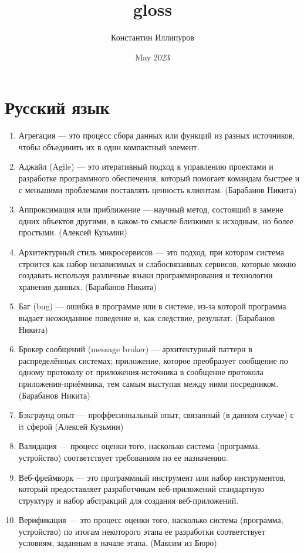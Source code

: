 \documentclass{article}
\title{gloss}
\author{Константин Иллипуров}
\date{May 2023}
\begin{document}

\section{Русский язык}
\begin{enumerate}
    \item Агрегация --- это процесс сбора данных или функций из разных источников, чтобы объединить их в один компактный элемент.
    \item Аджайл (Agile) --- это итеративный подход к управлению проектами и разработке программного обеспечения, который помогает командам быстрее и с меньшими проблемами поставлять ценность клиентам. (Барабанов Никита)
    \item Аппроксимация или приближение --- научный метод, состоящий в замене одних объектов другими, в каком-то смысле близкими к исходным, но более простыми. (Алексей Кузьмин) 
    \item Архитектурный стиль микросервисов --- это подход, при котором система строится как набор независимых и слабосвязанных сервисов, которые можно создавать используя различные языки программирования и технологии хранения данных. (Барабанов Никита)
    \item Баг (bug) --- ошибка в программе или в системе, из-за которой программа выдает неожиданное поведение и, как следствие, результат. (Барабанов Никита)
    \item Брокер сообщений (message broker) --- архитектурный паттерн в распределённых системах; приложение, которое преобразует сообщение по одному протоколу от приложения-источника в сообщение протокола приложения-приёмника, тем самым выступая между ними посредником. (Барабанов Никита)
    \item Бэкграунд опыт --- проффесиональный опыт, связанный (в данном случае) с it сферой (Алексей Кузьмин)
    \item Валидация --- процесс оценки того, насколько система (программа, устройство) соответствует требованиям по ее назначению.
    \item Веб-фреймворк --- это программный инструмент или набор инструментов, который предоставляет разработчикам веб-приложений стандартную структуру и набор абстракций для создания веб-приложений.
    \item Верификация --- это процесс оценки того, насколько система (программа, устройство) по итогам некоторого этапа ее разработки соответствует условиям, заданным в начале этапа. (Максим из Бюро)

\end{enumerate}
\end{document}
